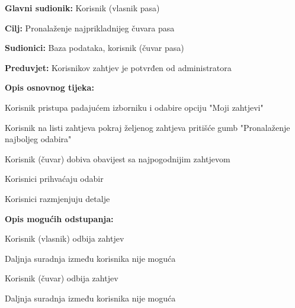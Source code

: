 					\noindent {}
					\begin{packed_item}
						
						\item \textbf{Glavni sudionik: } Korisnik (vlasnik pasa)
						\item  \textbf{Cilj:} Pronalaženje najprikladnijeg čuvara pasa
						\item  \textbf{Sudionici:} Baza podataka, korisnik (čuvar pasa)
						\item  \textbf{Preduvjet:} Korisnikov zahtjev je potvrđen od administratora
						\item  \textbf{Opis osnovnog tijeka:}
						
						\item[] \begin{packed_enum}
							
							\item Korisnik pristupa padajućem izborniku i odabire opciju "Moji zahtjevi"    
							\item Korisnik na listi zahtjeva pokraj željenog zahtjeva pritišće gumb "Pronalaženje najboljeg odabira"  
							\item Korisnik (čuvar) dobiva obavijest sa najpogodnijim zahtjevom
							\item Korisnici prihvaćaju odabir
							\item Korisnici razmjenjuju detalje
							
						\end{packed_enum}
					
						\item  \textbf{Opis mogućih odstupanja:}
			
							\item[] \begin{packed_item}
							\item[4.a] Korisnik (vlasnik) odbija zahtjev
							\item[] \begin{packed_enum}
			
								\item Daljnja suradnja između korisnika nije moguća
			
							\end{packed_enum}
						
							\item[4.b] Korisnik (čuvar) odbija zahtjev
							\item[] \begin{packed_enum}
								
								\item Daljnja suradnja između korisnika nije moguća
								
							\end{packed_enum}
						\end{packed_item}
					\end{packed_item}	
				
